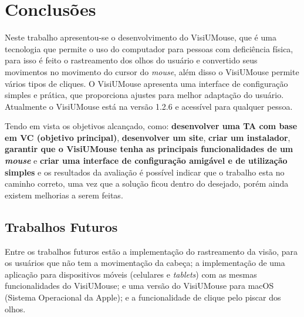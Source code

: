 \chapter{Conclusões}\label{CAP-consideracoes-finais-trabalhos-futuros}
Neste trabalho apresentou-se o desenvolvimento do VisiUMouse, que é uma tecnologia que permite o uso do computador para pessoas com deficiência física, para isso é feito o rastreamento dos olhos do usuário e convertido seus movimentos no movimento do cursor do \textit{mouse}, além disso o VisiUMouse permite vários tipos de cliques. O VisiUMouse apresenta uma interface de configuração simples e prática, que proporciona ajustes para melhor adaptação do usuário. Atualmente o VisiUMouse está na versão 1.2.6 e acessível para qualquer pessoa.

Tendo em vista os objetivos alcançado, como: \textbf{desenvolver uma TA com base em VC (objetivo principal)}, \textbf{desenvolver um site}, \textbf{criar um instalador}, \textbf{garantir que o VisiUMouse tenha as principais funcionalidades de um \textit{mouse}} e \textbf{criar uma interface de configuração amigável e de utilização simples} e os resultados da avaliação é possível indicar que o trabalho esta no caminho correto, uma vez que a solução ficou dentro do desejado, porém ainda existem melhorias a serem feitas.

\section{Trabalhos Futuros}

Entre os trabalhos futuros estão a implementação do rastreamento da visão, para os usuários que não tem a movimentação da cabeça; a implementação de uma aplicação para dispositivos móveis (celulares e \textit{tablets}) com as mesmas funcionalidades do VisiUMouse; e uma versão do VisiUMouse para macOS (Sistema Operacional da Apple); e a funcionalidade de clique pelo piscar dos olhos.

